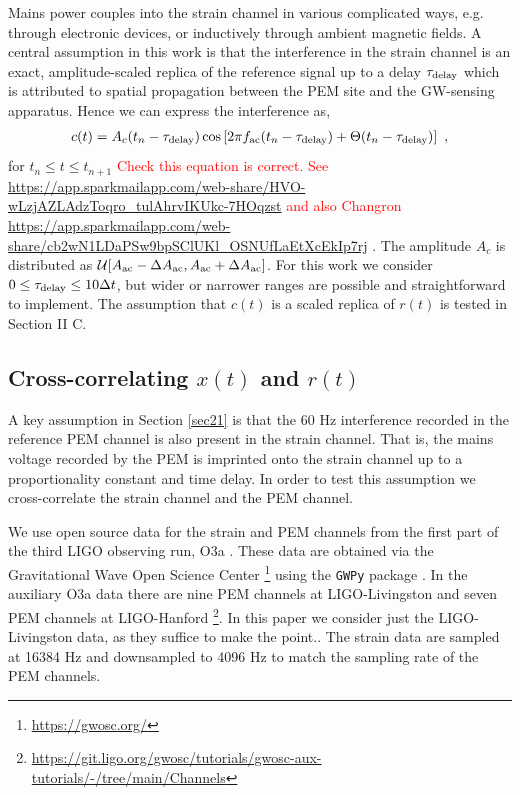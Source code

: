 \documentclass[pra,superscriptaddress,reprint,amsmath,amssymb,nofootinbib]{revtex4-2}
\begin{document}
Mains power couples into the strain channel in various complicated ways, e.g. through electronic devices, or inductively through ambient magnetic fields. A central assumption in this work is that the interference in the strain channel is an exact, amplitude-scaled replica of the reference signal up to a delay $\tau_{\rm delay}$ which is attributed to spatial propagation between the PEM site and the GW-sensing apparatus. Hence we can express the interference as, 
 \begin{eqnarray}
	c(t) = A_c(t_n - \tau_{\rm delay}) \cos \left[ 2 \pi f_{\rm ac} (t_n - \tau_{\rm delay}) + \Theta(t_n - \tau_{\rm delay}	)\right] \ ,
	\label{eq:vclutter}
\end{eqnarray}
for $t_n \leq t \leq t_{n+1}$ \textcolor{red}{Check this equation is correct. See \url{https://app.sparkmailapp.com/web-share/HVO-wLzjAZLAdzToqro_tulAhrvIKUkc-7HOqzst} and also Changron \url{https://app.sparkmailapp.com/web-share/cb2wN1LDaPSw9bpSClUKl_OSNUfLaEtXcEkIp7rj}} . The amplitude $A_c$ is distributed as $\mathcal{U}[A_{\rm ac}- \Delta A_{\rm ac} ,A_{\rm ac} + \Delta A_{\rm ac} ]$. For this work we consider $0 \leq \tau_{\rm delay} \leq 10 \Delta t$, but wider or narrower ranges are possible and straightforward to implement. The assumption that $c(t)$ is a scaled replica of $r(t)$ is tested in Section II C.




\subsection{Cross-correlating $x(t)$ and $r(t)$}  \label{sec23}
A key assumption in Section \ref{sec21} is that the 60 Hz interference recorded in the reference PEM channel is also present in the strain channel. That is, the mains voltage recorded by the PEM is imprinted onto the strain channel up to a proportionality constant and time delay. In order to test this assumption we cross-correlate the strain channel and the PEM channel. \newline 

We use open source data for the strain and PEM channels from the first part of the third LIGO observing run, O3a \cite{LIGO_O3}. These data are obtained via the Gravitational Wave
Open Science Center \footnote{\url{https://gwosc.org/}} using the \texttt{GWPy} package \cite{gwpy}. In the auxiliary O3a data there are nine PEM channels at LIGO-Livingston and seven PEM channels at LIGO-Hanford \footnote{\url{https://git.ligo.org/gwosc/tutorials/gwosc-aux-tutorials/-/tree/main/Channels}}. In this paper we consider just the LIGO-Livingston data, as they suffice to make the point.. The strain data are sampled at 16384 Hz and downsampled to 4096 Hz to match the sampling rate of the PEM channels. \newline 
\end{document}
